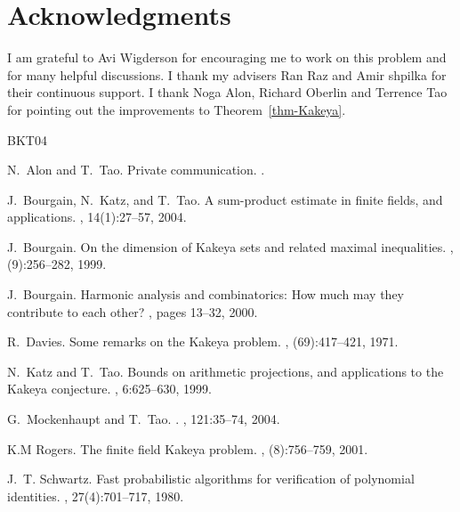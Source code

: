 \documentclass[12pt]{article}
\begin{document}
\section{Acknowledgments}
I am  grateful  to Avi Wigderson for encouraging me to work on
this problem and for many helpful discussions. I thank my advisers
Ran Raz and Amir shpilka for their continuous support. I thank
Noga Alon, Richard Oberlin and Terrence Tao for pointing out the
improvements to Theorem~\ref{thm-Kakeya}.









\begin{thebibliography}{BKT04}

N.~Alon and T.~Tao.
\newblock Private communication.
.

J.~Bourgain, N.~Katz, and T.~Tao.
\newblock A sum-product estimate in finite fields, and applications.
, 14(1):27--57, 2004.

J.~Bourgain.
\newblock On the dimension of {K}akeya sets and related maximal inequalities.
, (9):256--282, 1999.

J.~Bourgain.
\newblock Harmonic analysis and combinatorics: How much may they contribute to
  each other?
, pages 13--32, 2000.

R.~Davies.
\newblock Some remarks on the {K}akeya problem.
, (69):417--421, 1971.

N.~Katz and T.~Tao.
\newblock Bounds on arithmetic projections, and applications to the {K}akeya
  conjecture.
, 6:625--630, 1999.

G.~Mockenhaupt and T.~Tao.
.
, 121:35--74, 2004.

K.M Rogers.
\newblock The finite field {K}akeya problem.
, (8):756--759, 2001.

J.~T. Schwartz.
\newblock Fast probabilistic algorithms for verification of polynomial
  identities.
, 27(4):701--717, 1980.


\end{thebibliography}
\end{document}
